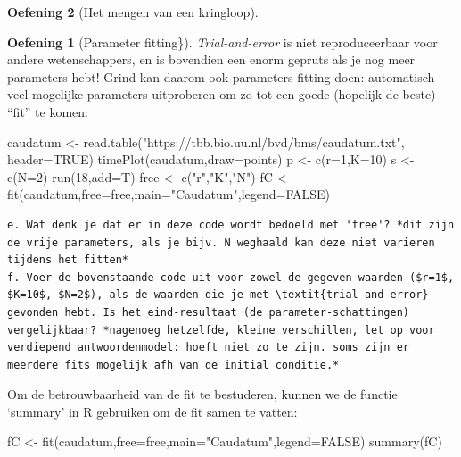 \documentclass[
  a4paper,
]{scrbook}
\newenvironment{Shaded}{\begin{snugshade}}{\end{snugshade}}
\newcommand{\AttributeTok}[1]{\textcolor[rgb]{0.40,0.45,0.13}{#1}}
\newcommand{\ConstantTok}[1]{\textcolor[rgb]{0.56,0.35,0.01}{#1}}
\newcommand{\DecValTok}[1]{\textcolor[rgb]{0.68,0.00,0.00}{#1}}
\newcommand{\FunctionTok}[1]{\textcolor[rgb]{0.28,0.35,0.67}{#1}}
\newcommand{\NormalTok}[1]{\textcolor[rgb]{0.00,0.23,0.31}{#1}}
\newcommand{\OtherTok}[1]{\textcolor[rgb]{0.00,0.23,0.31}{#1}}
\newcommand{\StringTok}[1]{\textcolor[rgb]{0.13,0.47,0.30}{#1}}
\theoremstyle{definition}
\newtheorem{exercise}{Oefening}[chapter]
\theoremstyle{remark}
\begin{document}
\begin{exercise}[Het mengen van een
kringloop]
\begin{exercise}[Parameter
fitting\}]
\emph{Trial-and-error} is niet reproduceerbaar voor andere
wetenschappers, en is bovendien een enorm gepruts als je nog meer
parameters hebt! Grind kan daarom ook parameters-fitting doen:
automatisch veel mogelijke parameters uitproberen om zo tot een goede
(hopelijk de beste) ``fit'' te komen:

\begin{Shaded}
\begin{Highlighting}[]
\NormalTok{    caudatum }\OtherTok{\textless{}{-}} \FunctionTok{read.table}\NormalTok{(}\StringTok{"https://tbb.bio.uu.nl/bvd/bms/caudatum.txt"}\NormalTok{, }\AttributeTok{header=}\ConstantTok{TRUE}\NormalTok{)}
    \FunctionTok{timePlot}\NormalTok{(caudatum,}\AttributeTok{draw=}\NormalTok{points)}
\NormalTok{    p }\OtherTok{\textless{}{-}} \FunctionTok{c}\NormalTok{(}\AttributeTok{r=}\DecValTok{1}\NormalTok{,}\AttributeTok{K=}\DecValTok{10}\NormalTok{)   }
\NormalTok{    s }\OtherTok{\textless{}{-}} \FunctionTok{c}\NormalTok{(}\AttributeTok{N=}\DecValTok{2}\NormalTok{)}
    \FunctionTok{run}\NormalTok{(}\DecValTok{18}\NormalTok{,}\AttributeTok{add=}\NormalTok{T)}
\NormalTok{    free }\OtherTok{\textless{}{-}} \FunctionTok{c}\NormalTok{(}\StringTok{"r"}\NormalTok{,}\StringTok{"K"}\NormalTok{,}\StringTok{"N"}\NormalTok{)}
\NormalTok{    fC }\OtherTok{\textless{}{-}} \FunctionTok{fit}\NormalTok{(caudatum,}\AttributeTok{free=}\NormalTok{free,}\AttributeTok{main=}\StringTok{"Caudatum"}\NormalTok{,}\AttributeTok{legend=}\ConstantTok{FALSE}\NormalTok{)}
\end{Highlighting}
\end{Shaded}

\begin{verbatim}
e. Wat denk je dat er in deze code wordt bedoeld met 'free'? *dit zijn de vrije parameters, als je bijv. N weghaald kan deze niet varieren tijdens het fitten*
f. Voer de bovenstaande code uit voor zowel de gegeven waarden ($r=1$, $K=10$, $N=2$), als de waarden die je met \textit{trial-and-error} gevonden hebt. Is het eind-resultaat (de parameter-schattingen) vergelijkbaar? *nagenoeg hetzelfde, kleine verschillen, let op voor verdiepend antwoordenmodel: hoeft niet zo te zijn. soms zijn er meerdere fits mogelijk afh van de initial conditie.*
\end{verbatim}

Om de betrouwbaarheid van de fit te bestuderen, kunnen we de functie
`summary' in R gebruiken om de fit samen te vatten:

\begin{Shaded}
\begin{Highlighting}[]
\NormalTok{fC }\OtherTok{\textless{}{-}} \FunctionTok{fit}\NormalTok{(caudatum,}\AttributeTok{free=}\NormalTok{free,}\AttributeTok{main=}\StringTok{"Caudatum"}\NormalTok{,}\AttributeTok{legend=}\ConstantTok{FALSE}\NormalTok{)}
\FunctionTok{summary}\NormalTok{(fC)}
\end{Highlighting}
\end{Shaded}


\end{exercise}
\end{exercise}
\end{document}
